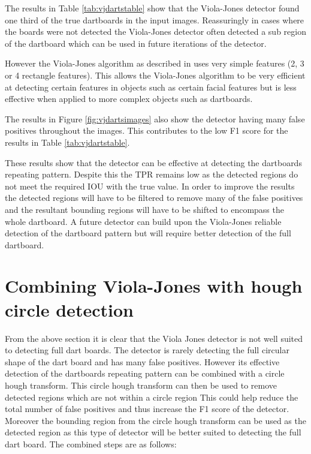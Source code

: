 \documentclass{article}
\begin{document}
\begin{multicols}{2}
The results in Table \ref{tab:vjdartstable} show that the Viola-Jones detector
found one third of the true dartboards in the input images. Reassuringly in
cases where the boards were not detected the Viola-Jones detector often
detected a sub region of the dartboard which can be used in future iterations
of the detector.

However the Viola-Jones algorithm as described in \cite{vj} uses very simple
features (2, 3 or 4 rectangle features). This allows the Viola-Jones algorithm
to be very efficient at detecting certain features in objects such as certain
facial features but is less effective when applied  to more complex objects
such as dartboards. 

The results in Figure \ref{fig:vjdartsimages} also show the detector having
many false positives throughout the images. This contributes to the low F1
score for the results in Table \ref{tab:vjdartstable}.  

These results show that the detector can be effective at detecting the
dartboards repeating pattern. Despite this the TPR remains low as the detected
regions do not meet the required IOU with the true value.  In order to improve
the results the detected regions will have to be filtered to remove many of the
false positives and the resultant bounding regions will have to be shifted to
encompass the whole dartboard. A future detector can build upon the Viola-Jones
reliable detection of the dartboard pattern but will require better detection
of the full dartboard. 

\section{Combining Viola-Jones with hough circle detection}

From the above section it is clear that the Viola Jones detector is not well
suited to detecting full dart boards.  The detector is rarely detecting the
full circular shape of the dart board and has many false positives. However its
effective detection of the dartboards repeating pattern can be combined with a
circle hough transform. This circle hough transform can then be used to remove
detected regions which are not within a circle region This could help reduce
the total number of false positives and thus increase the F1 score of the
detector. Moreover the bounding region from the circle hough transform can be
used as the detected region as this type of detector will be better suited to
detecting the full dart board. The combined steps are as follows:


\end{multicols}
\end{document}
